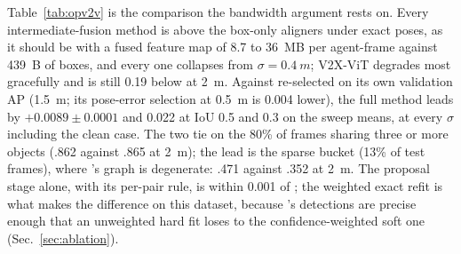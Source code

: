 Table~\ref{tab:opv2v} is the comparison the bandwidth argument rests on. Every intermediate-fusion method is above the box-only aligners under exact poses, as it should be with a fused feature map of 8.7 to \SI{36}{MB} per agent-frame against \SI{439}{B} of boxes, and every one collapses from $\sigma=\SI{0.4}{m}$; V2X-ViT degrades most gracefully and is still 0.19 below \paper at \SI{2}{m}. Against \freealign re-selected on its own validation AP (\SI{1.5}{m}; its pose-error selection at \SI{0.5}{m} is 0.004 lower), the full method leads by $+0.0089\pm0.0001$  and 0.022 at IoU 0.5 and 0.3 on the sweep means, at every $\sigma$ including the clean case. The two tie on the 80\% of frames sharing three or more objects (.862 against .865 at \SI{2}{m}); the lead is the sparse bucket (13\% of test frames), where \freealign's graph is degenerate: .471 against .352 at \SI{2}{m}. The proposal stage alone, with its per-pair rule, is within 0.001 of \freealign; the weighted exact refit is what makes the difference on this dataset, because \opvv's detections are precise enough that an unweighted hard fit loses to the confidence-weighted soft one (Sec.~\ref{sec:ablation}).

